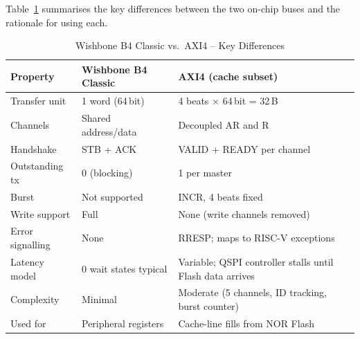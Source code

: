 Table~\ref{tab:asBusCompare} summarises the key differences between the
two on-chip buses and the rationale for using each.

\begin{table}[H]
\caption{Wishbone B4 Classic vs.\ AXI4 -- Key Differences}
\label{tab:asBusCompare}
\centering
\begin{tabularx}{\textwidth}{|l |X |X|}
  \hline
  Property & Wishbone B4 Classic & AXI4 (cache subset) \\
  \hline
  \hline
  Transfer unit     & 1 word (64\,bit)        & 4 beats $\times$ 64\,bit = 32\,B \\
  \hline
  Channels          & Shared address/data     & Decoupled AR and R \\
  \hline
  Handshake         & STB + ACK               & VALID + READY per channel \\
  \hline
  Outstanding tx    & 0 (blocking)            & 1 per master \\
  \hline
  Burst             & Not supported           & INCR, 4 beats fixed \\
  \hline
  Write support     & Full                    & None (write channels removed) \\
  \hline
  Error signalling  & None                    & RRESP; maps to RISC-V exceptions \\
  \hline
  Latency model     & 0 wait states typical   & Variable; QSPI controller stalls until Flash data arrives \\
  \hline
  Complexity        & Minimal                 & Moderate (5 channels, ID tracking, burst counter) \\
  \hline
  Used for          & Peripheral registers    & Cache-line fills from NOR Flash \\
  \hline
\end{tabularx}
\end{table}


